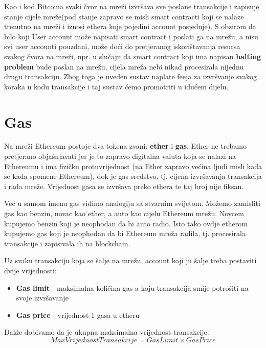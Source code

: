 \documentclass[12pt]{report}
\begin{document}
Kao i kod Bitcoina svaki čvor na mreži izvršava sve poslane transakcije i zapisuje stanje cijele mreže(pod stanje zapravo se misli smart contracti koji se nalaze trenutno na mreži i iznosi ethera koje pojedini account posjeduje). S obzirom da bilo koji User account može napisati smart contract i poslati ga na mrežu, a nisu svi user accounti pouzdani, može doći do pretjeranog iskorištavanja resursa svakog čvora na mreži, npr. u slučaju da smart contract koji ima napisan \textbf{halting problem} bude poslan na mrežu, cijela mreža nebi nikad procesirala nijednu drugu transakciju. Zbog toga je uveden sustav naplate feeja za izvršvanje svakog koraka u kodu transakcije i taj sustav ćemo promotriti u idućem dijelu.

\section{Gas}

Na mreži Ethereum postoje dva tokena zvani: \textbf{ether} i \textbf{gas}. Ether ne trebamo pretjerano objašnjavati jer je to zapravo digitalna valuta koja se nalazi na Ethereumu i ima fizičku protuvrijednost (na Ether zapravo većina ljudi misli kada se kada spomene Ethereum), dok je gas sredstvo, tj. cijena izvršavanja transakcija i rada mreže. Vrijednost gasa se izvršava preko ethera te taj broj nije fiksan.

\begin{tcolorbox}
Već u samom imenu gas vidimo analogiju sa stvarnim svijetom. Možemo zamisliti gas kao benzin, novac kao ether, a auto kao cijelu Ethereum mrežu. Novcem kupujemo benzin koji je neophodan da bi auto radio. Isto tako ovdje etherom kupujemo gas koji je neophodan da bi Ethereum mreža radila, tj. procesirala transakcije i zapisivala ih na blockchain.
\end{tcolorbox}

Uz svaku transakciju koja se šalje na mrežu, account koji ju šalje treba postaviti dvije vrijednosti:

\begin{itemize}
    \item \textbf{Gas limit} - maksimalna količina gas-a koju transakcija smije potrošiti na svoje izvršavanje
    \item \textbf{Gas price} - vrijednost 1 gasa u etheru
\end{itemize}

Dakle dobivamo da je ukupna maksimalna vrijednost transakcije:
\begin{equation}
    MaxVrijednostTransakcije = GasLimit \times GasPrice
\end{equation}
\end{document}
